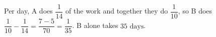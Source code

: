 Per day, A does $\dfrac1{14}$ of the work and together they do $\dfrac1{10}$, so B does $\dfrac1{10}-\dfrac1{14}=\dfrac{7-5}{70}=\dfrac1{35}$. B alone takes $\boxed{35\text{ days}}$.
